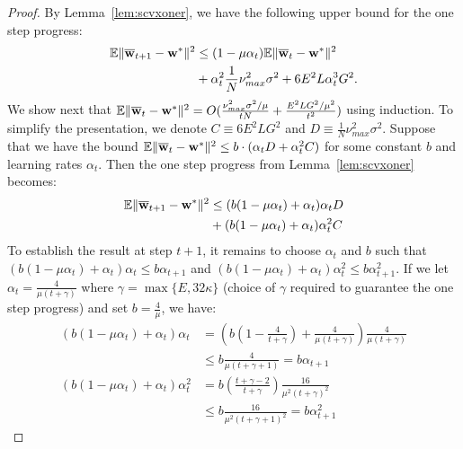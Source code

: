 \begin{proof}
	By Lemma~\ref{lem:scvxoner}, we have the following upper bound for the one step progress: 
	\begin{align*}
	\mathbb{E}\|{\overline{\mathbf{w}}}_{t+1}-{\mathbf{w}}^{\ast}\|^{2} & \leq(1-\mu\alpha_{t})\mathbb{E}\|{\overline{\mathbf{w}}}_{t}-{\mathbf{w}}^{\ast}\|^{2}\\
	& +\alpha_{t}^{2}\frac{1}{N}\nu_{max}^{2}\sigma^{2}+6E^{2}L\alpha_{t}^{3}G^{2}.
	\end{align*}
	We show next that $\mathbb{E}\|{\overline{\mathbf{w}}}_{t}-{\mathbf{w}}^{\ast}\|^{2}=O(\frac{\nu_{max}^{2}\sigma^{2}/\mu}{tN}+\frac{E^{2}LG^{2}/\mu^2}{t^{2}})$ using induction. 
	To simplify the presentation, we denote $C\equiv6E^{2}LG^{2}$ and $D\equiv\frac{1}{N}\nu_{max}^{2}\sigma^{2}$.
	Suppose that we have the bound $\mathbb{E}\|{\overline{\mathbf{w}}}_{t}-{\mathbf{w}}^{\ast}\|^{2}\leq b\cdot(\alpha_{t}D+\alpha_{t}^{2}C)$
	for some constant $b$ and learning rates $\alpha_{t}$. Then the one step progress from Lemma~\ref{lem:scvxoner} becomes:
	\begin{align*}
	\mathbb{E}\|{\overline{\mathbf{w}}}_{t+1}-{\mathbf{w}}^{\ast}\|^{2} & \leq (b(1-\mu\alpha_{t})+\alpha_{t})\alpha_{t}D\\
	& +(b(1-\mu\alpha_{t})+\alpha_{t})\alpha_{t}^{2}C
	\end{align*}
	To establish the result at step $t+1$, it remains to choose $\alpha_{t}$ and $b$ such that $(b(1-\mu\alpha_{t})+\alpha_{t})\alpha_{t}\leq b\alpha_{t+1}$
	and $(b(1-\mu\alpha_{t})+\alpha_{t})\alpha_{t}^{2}\leq b\alpha_{t+1}^{2}$.
	If we let $\alpha_{t}=\frac{4}{\mu(t+\gamma)}$
	where $\gamma=\max\{E,32\kappa\}$ (choice of $\gamma$ required to guarantee the one step progress) and set $b=\frac{4}{\mu}$, we have:
	\begin{align*}
	(b(1-\mu\alpha_{t})+\alpha_{t})\alpha_{t}  &=\left(b(1-\frac{4}{t+\gamma})+\frac{4}{\mu(t+\gamma)}\right)\frac{4}{\mu(t+\gamma)}\\
	 &\leq b\frac{4}{\mu(t+\gamma+1)}=b\alpha_{t+1}\\
	 (b(1-\mu\alpha_{t})+\alpha_{t})\alpha_{t}^{2} &=b(\frac{t+\gamma-2}{t+\gamma})\frac{16}{\mu^{2}(t+\gamma)^{2}} \\
	 & \leq b\frac{16}{\mu^{2}(t+\gamma+1)^{2}}=b\alpha_{t+1}^{2}

\end{align*}
\end{proof}
